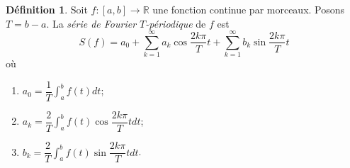 \documentclass{report}
\newcommand*{\dsum}[4]{\displaystyle\sum_{#1=#2}^{#3}#4}
\newcommand*{\dint}[3]{\displaystyle\int_{#1}^{#2}#3}
\newcommand*{\reels}{\mathbb{R}}
\theoremstyle{definition}
\newtheorem*{defin}{D\'efinition}
\theoremstyle{remark}
\begin{document}
	\begin{defin}
		Soit $f:[a,b] \to \reels$ une fonction continue par morceaux. Posons $T=b-a$. La \emph{s\'erie de Fourier $T$-p\'eriodique} de $f$ est
		\begin{equation*}
			S(f) = a_0 + \dsum{k}{1}{\infty}{a_k \cos\dfrac{2k\pi}{T}t} + \dsum{k}{1}{\infty}{b_k \sin\dfrac{2k\pi}{T}t}
		\end{equation*}
		o\`u
		\begin{enumerate}[label=\roman*)]
			\item $a_0 = \dfrac{1}{T} \dint{a}{b}{f(t) dt}$;
			\item $a_k = \dfrac{2}{T} \dint{a}{b}{f(t)\cos \dfrac{2k\pi}{T}t dt}$;
			\item $b_k = \dfrac{2}{T} \dint{a}{b}{f(t)\sin \dfrac{2k\pi}{T}t dt}$.
		\end{enumerate}
	\end{defin}
\end{document}
